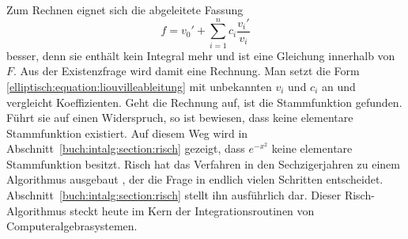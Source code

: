 Zum Rechnen eignet sich die abgeleitete Fassung
\begin{equation}
f
=
v_0' + \sum_{i=1}^n c_i \frac{v_i'}{v_i}
\label{elliptisch:equation:liouvilleableitung}
\end{equation}
besser, denn sie enthält kein Integral mehr und ist eine Gleichung
innerhalb von $F$.
Aus der Existenzfrage wird damit eine Rechnung.
Man setzt die Form \eqref{elliptisch:equation:liouvilleableitung} mit
unbekannten $v_i$ und $c_i$ an und vergleicht Koeffizienten.
Geht die Rechnung auf, ist die Stammfunktion gefunden.
Führt sie auf einen Widerspruch, so ist bewiesen, dass keine
elementare Stammfunktion existiert.
Auf diesem Weg wird in
Abschnitt~\ref{buch:intalg:section:risch} gezeigt, dass $e^{-x^2}$
keine elementare Stammfunktion besitzt.
Risch hat das Verfahren in den Sechzigerjahren zu einem Algorithmus
ausgebaut \cite{elliptisch:risch}, der die Frage in endlich vielen
Schritten entscheidet.
Abschnitt~\ref{buch:intalg:section:risch} stellt ihn ausführlich dar.
Dieser Risch-Algorithmus steckt heute im Kern der
Integrationsroutinen von Computeralgebrasystemen.
%

